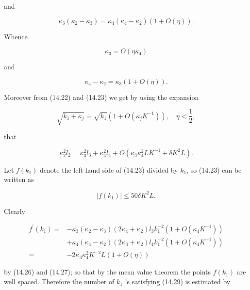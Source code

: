 \documentclass[10pt]{article}
\begin{document}
and


\begin{equation*}
\kappa_{3}\left(\kappa_{2}-\kappa_{3}\right)=\kappa_{4}\left(\kappa_{4}-\kappa_{2}\right)(1+O(\eta)) . \tag{14.25}
\end{equation*}


Whence


\begin{equation*}
\kappa_{3}=O\left(\eta \kappa_{4}\right) \tag{14.26}
\end{equation*}


and


\begin{equation*}
\kappa_{4}-\kappa_{2}=\kappa_{3}(1+O(\eta)) . \tag{14.27}
\end{equation*}


Moreover from (14.22) and (14.23) we get by using the expansion

$$
\sqrt{k_{1}+\kappa_{j}}=\sqrt{k_{1}}\left(1+O\left(\kappa_{j} K^{-1}\right)\right), \quad \eta<\frac{1}{2},
$$

that


\begin{equation*}
\kappa_{2}^{2} l_{2}=\kappa_{3}^{2} l_{3}+\kappa_{4}^{2} l_{4}+O\left(\kappa_{3} \kappa_{4}^{2} L K^{-1}+\delta K^{2} L\right) . \tag{14.28}
\end{equation*}


Let $f\left(k_{1}\right)$ denote the left-hand side of (14.23) divided by $k_{1}$, so (14.23) can be written as


\begin{equation*}
\left|f\left(k_{1}\right)\right| \leqslant 50 \delta K^{2} L . \tag{14.29}
\end{equation*}


Clearly

$$
\begin{aligned}
f^{\prime}(k_{1})= & -\kappa_{3}\left(\kappa_{2}-\kappa_{3}\right)\left(2 \kappa_{4}+\kappa_{2}\right) l_{3} k_{1}^{-2}\left(1+O\left(\kappa_{4} K^{-1}\right)\right) \\
& +\kappa_{4}\left(\kappa_{4}-\kappa_{2}\right)\left(2 \kappa_{3}+\kappa_{2}\right) l_{4} k_{1}^{-2}\left(1+O\left(\kappa_{4} K^{-1}\right)\right) \\
= & -2 \kappa_{3} \kappa_{4}^{2} K^{-2} L(1+O(\eta))
\end{aligned}
$$

by (14.26) and (14.27); so that by the mean value theorem the points $f\left(k_{1}\right)$ are well spaced. Therefore the number of $k_{1}$ 's satisfying (14.29) is estimated by
\end{document}
